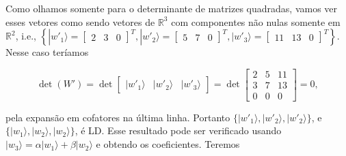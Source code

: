 \documentclass[11pt]{article}
\begin{document}
Como olhamos somente para o determinante de matrizes quadradas, vamos
ver esses vetores como sendo vetores de \(\mathbb{R}^{3}\) com
componentes não nulas somente em \(\mathbb{R}^{2}\), i.e.,
\(\left\{|w'_{1}\rangle=\begin{bmatrix} 2 & 3 & 0 \end{bmatrix}^{T},|w'_{2}\rangle=\begin{bmatrix} 5 & 7 & 0 \end{bmatrix}^{T},|w'_{3}\rangle=\begin{bmatrix} 11 & 13 & 0 \end{bmatrix}^{T}\right\}\).
Nesse caso teríamos

\begin{equation}
\det(W')=\det\begin{bmatrix} |w'_{1}\rangle & |w'_{2}\rangle & |w'_{3}\rangle\end{bmatrix}=\det\begin{bmatrix} 2 & 5 & 11 \\ 3 & 7 & 13 \\ 0 & 0 & 0 \end{bmatrix}=0,
\end{equation}

pela expansão em cofatores na última linha. Portanto
\(\{|w'_{1}\rangle,|w'_{2}\rangle,|w'_{2}\rangle\}\), e
\(\{|w_{1}\rangle,|w_{2}\rangle,|w_{2}\rangle\}\), é LD. Esse resultado
pode ser verificado usando
\(|w_{3}\rangle=\alpha|w_{1}\rangle+\beta|w_{2}\rangle\) e obtendo os
coeficientes. Teremos
\end{document}
